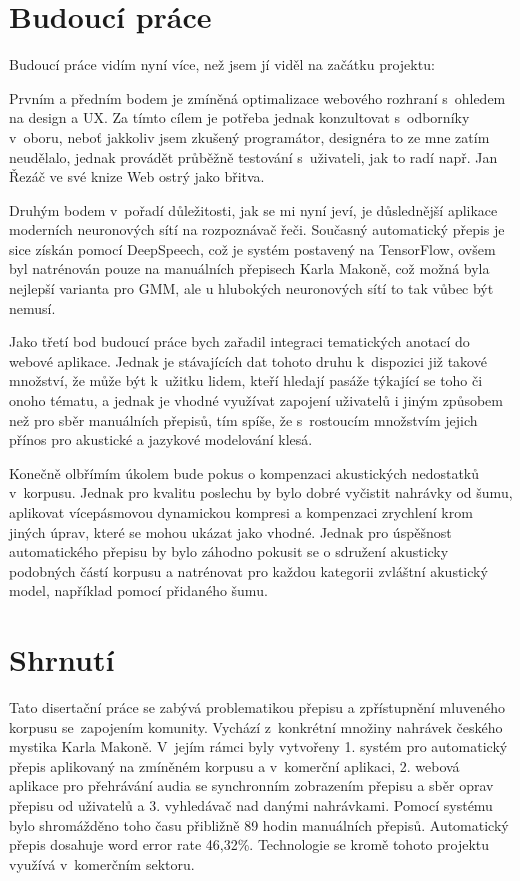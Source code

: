 \section{Budoucí práce}

Budoucí práce vidím nyní více, než jsem jí viděl na začátku projektu:

Prvním a předním bodem je zmíněná optimalizace webového rozhraní s~ohledem na
design a UX. Za tímto cílem je potřeba jednak konzultovat s~odborníky v~oboru,
neboť jakkoliv jsem zkušený programátor, designéra to ze mne zatím neudělalo, jednak provádět průběžně testování
s~uživateli, jak to radí např. Jan Řezáč ve své knize Web ostrý jako
břitva\cite{rezac2016web}.

Druhým bodem v~pořadí důležitosti, jak se mi nyní jeví, je důslednější aplikace
moderních neuronových sítí na rozpoznávač řeči. Současný automatický přepis je
sice získán pomocí DeepSpeech, což je systém postavený na TensorFlow, ovšem byl
natrénován pouze na manuálních
přepisech Karla Makoně, což možná byla nejlepší varianta pro GMM, ale u
hlubokých neuronových sítí to tak vůbec být nemusí.

Jako třetí bod budoucí práce bych zařadil integraci tematických anotací do
webové aplikace. Jednak je stávajících dat tohoto druhu k~dispozici již takové
množství, že může být k~užitku lidem, kteří hledají pasáže týkající se toho či
onoho tématu, a jednak je vhodné využívat zapojení uživatelů i jiným způsobem
než pro sběr manuálních přepisů, tím spíše, že s~rostoucím množstvím jejich
přínos pro akustické a jazykové modelování klesá.

Konečně olbřímím úkolem bude pokus o kompenzaci akustických nedostatků
v~korpusu. Jednak pro kvalitu poslechu by bylo dobré vyčistit nahrávky od šumu,
aplikovat vícepásmovou dynamickou kompresi a kompenzaci zrychlení krom jiných
úprav, které se mohou ukázat jako vhodné. Jednak pro úspěšnost automatického
přepisu by bylo záhodno pokusit se o sdružení akusticky podobných částí korpusu
a natrénovat pro každou kategorii zvláštní akustický model, například pomocí
přidaného šumu.\cite{zur2009noise}\cite{VARGA1993247}

\section{Shrnutí}

Tato disertační práce se zabývá problematikou přepisu a zpřístupnění mluveného
korpusu se~zapojením komunity. Vychází z~konkrétní množiny nahrávek českého mystika Karla Makoně.
V~jejím rámci byly vytvořeny 1. systém pro automatický přepis aplikovaný na zmíněném
korpusu a v~komerční aplikaci, 2. webová aplikace pro přehrávání audia se
synchronním zobrazením přepisu a sběr oprav přepisu od uživatelů a 3.
vyhledávač nad danými nahrávkami. Pomocí systému bylo shromážděno toho času
přibližně 89 hodin manuálních přepisů. Automatický přepis dosahuje word error
rate 46,32\%. Technologie se kromě tohoto projektu využívá v~komerčním sektoru.

